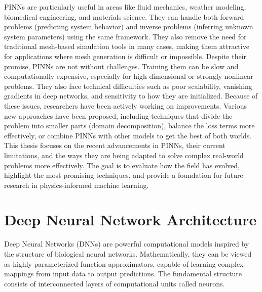 \documentclass[11pt,twoside,openright]{report}
\begin{document}
PINNs are particularly useful in areas like fluid mechanics, weather modeling, biomedical engineering, and materials science. They can handle both forward problems (predicting system behavior) and inverse problems (inferring unknown system parameters) using the same framework. They also remove the need for traditional mesh-based simulation tools in many cases, making them attractive for applications where mesh generation is difficult or impossible.
Despite their promise, PINNs are not without challenges. Training them can be slow and computationally expensive, especially for high-dimensional or strongly nonlinear problems. They also face technical difficulties such as poor scalability, vanishing gradients in deep networks, and sensitivity to how they are initialized. Because of these issues, researchers have been actively working on improvements. Various new approaches have been proposed, including techniques that divide the problem into smaller parts (domain decomposition), balance the loss terms more effectively, or combine PINNs with other models to get the best of both worlds.
This thesis focuses on the recent advancements in PINNs, their current limitations, and the ways they are being adapted to solve complex real-world problems more effectively. The goal is to evaluate how the field has evolved, highlight the most promising techniques, and provide a foundation for future research in physics-informed machine learning.

\section{Deep Neural Network Architecture}

Deep Neural Networks (DNNs) are powerful computational models inspired by the structure of biological neural networks. Mathematically, they can be viewed as highly parameterized function approximators, capable of learning complex mappings from input data to output predictions. The fundamental structure consists of interconnected layers of computational units called neurons.
\end{document}
